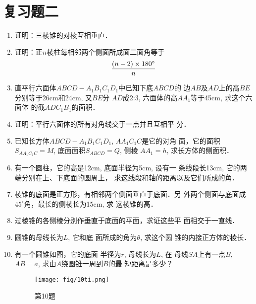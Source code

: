 \section*{复习题二}

\begin{enumerate}
    \item 证明：三棱锥的对棱互相垂直．
    \item 证明：正$n$棱柱每相邻两个侧面所成面二面角等于
\[\dfrac{(n-2)\times 180^{\circ}}{n}\]

\item 直平行六面体$ABCD-A_1B_1C_1D_1$中已知下底$ABCD$的
边$AB$及$AD$上的高$BE$分别等于26cm和24cm, 又$BE$分
$AD$成2:3, 六面体的高$AA_1$等于45cm, 求这个六面体
的截$ADC_1B_1$的面积．
\item 证明：平行六面体的所有对角线交于一点并且互相平
分．
\item 已知长方体$ABCD-A_1B_1C_1D_1$, $AA_1C_1C$是它的对角
面，它的面积$S_{AA_1C_1C}=M$, 底面面积$S_{ABCD}=Q$, 侧棱
$AA_1=h$, 求长方体的侧面积．
\item 有一个圆柱，它的高是12cm, 底面半径为5cm, 设有一
条线段长13cm, 它的两端分别在上、下底面的圆周上，
求这线段和轴的距离以及它们所成的角．
\item 
棱锥的底面是正方形，有相邻两个侧面垂直于底面．另
外两个侧面与底面成$45^{\circ}$角，最长的侧棱长为15cm, 求
这棱锥的高．
\item 过棱锥的各侧棱分别作垂直于底面的平面，求证这些平
面相交于一直线．
\item 圆锥的母线长为$L$, 它和底
面所成的角为$\theta$, 求这个圆
锥的内接正方体的棱长．
\item 有一个圆锥如图，它的底面
半径为$r$, 母线长为$L$, 在
母线$SA$上有一点$B$, $AB=a$,
求由$A$绕圆锥一周到$B$的最
短距离是多少？

\begin{figure}[htp]
    \centering
    \texttt{[image: fig/10ti.png]}
    \caption*{第10题}
\end{figure}


\end{enumerate}
